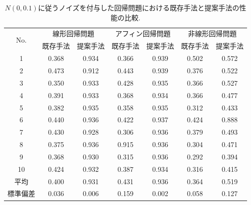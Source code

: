 \documentclass[11pt,oneside,openany,report]{jsbook}
\begin{document}
\begin{table}[tbp]
  \caption{$N(0,0.1)$に従うノイズを付与した回帰問題における既存手法と提案手法の性能の比較.}
  \label{table:exp
  :result:regression_noizy_0.1}
  \centering
  \begin{tabular}{|c|c|c|c|c|c|c|}
    \hline
    \multirow{2}{*}{No. } & \multicolumn{2}{c|}{線形回帰問題} & \multicolumn{2}{c|}{アフィン回帰問題} & \multicolumn{2}{c|}{非線形回帰問題} \\
    \cline{2-7}
    & 既存手法 & 提案手法 & 既存手法 & 提案手法 & 既存手法 & 提案手法 \\
    \hline \hline
    1       & 0.368 & 0.934 & 0.366 & 0.939 & 0.502 & 0.572 \\
    2       & 0.473 & 0.912 & 0.443 & 0.939 & 0.376 & 0.522 \\
    3       & 0.350 & 0.933 & 0.428 & 0.935 & 0.366 & 0.527\\
    4       & 0.391 & 0.933 & 0.368 & 0.934 & 0.366 & 0.477\\
    5       & 0.382 & 0.935 & 0.358 & 0.935 & 0.312 & 0.433\\
    6       & 0.440 & 0.936 & 0.422 & 0.937 & 0.424 & 0.888\\
    7       & 0.430 & 0.928 & 0.306 & 0.936 & 0.379 & 0.493\\
    8       & 0.375 & 0.936 & 0.915 & 0.936 & 0.304 & 0.471 \\
    9       & 0.368 & 0.930 & 0.315 & 0.936 & 0.292 & 0.394\\
    10      & 0.424 & 0.932 & 0.387 & 0.934 & 0.316 & 0.415 \\
    \hline
    平均 & 0.400 & 0.931 & 0.431 & 0.936 & 0.364 & 0.519 \\
    標準偏差 & 0.036 & 0.006 & 0.159 & 0.002 & 0.058 & 0.127 \\
    \hline
  \end{tabular}
\end{table}
\end{document}
